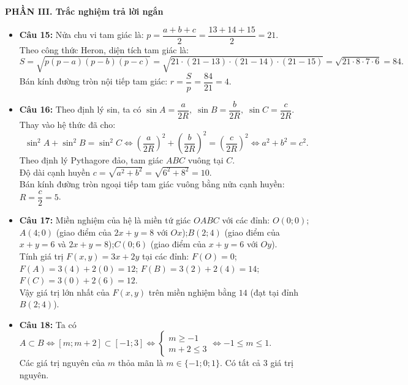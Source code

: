 \documentclass[12pt,a4paper]{article}
\begin{document}
\vspace{0.15cm}
\textbf{PHẦN III. Trắc nghiệm trả lời ngắn}
\begin{itemize}[leftmargin=0.6cm, itemsep=1.5pt, topsep=1pt]
    \item \textbf{Câu 15:} Nửa chu vi tam giác là: $p = \dfrac{a + b + c}{2} = \dfrac{13 + 14 + 15}{2} = 21$.\\
    Theo công thức Heron, diện tích tam giác là:
    \[
    S = \sqrt{p(p - a)(p - b)(p - c)} = \sqrt{21 \cdot (21 - 13) \cdot (21 - 14) \cdot (21 - 15)} = \sqrt{21 \cdot 8 \cdot 7 \cdot 6} = 84.
    \]
    Bán kính đường tròn nội tiếp tam giác: $r = \dfrac{S}{p} = \dfrac{84}{21} = 4$.
    \item \textbf{Câu 16:} Theo định lý sin, ta có $\sin A = \dfrac{a}{2R},\; \sin B = \dfrac{b}{2R},\; \sin C = \dfrac{c}{2R}$.\\
    Thay vào hệ thức đã cho:
    \[
    \sin^2 A + \sin^2 B = \sin^2 C \iff \left(\dfrac{a}{2R}\right)^2 + \left(\dfrac{b}{2R}\right)^2 = \left(\dfrac{c}{2R}\right)^2 \iff a^2 + b^2 = c^2.
    \]
    Theo định lý Pythagore đảo, tam giác $ABC$ vuông tại $C$.\\
    Độ dài cạnh huyền $c = \sqrt{a^2 + b^2} = \sqrt{6^2 + 8^2} = 10$.\\
    Bán kính đường tròn ngoại tiếp tam giác vuông bằng nửa cạnh huyền: $R = \dfrac{c}{2} = 5$.
    \item \textbf{Câu 17:} Miền nghiệm của hệ là miền tứ giác $OABC$ với các đỉnh:
    $O(0; 0)$;\quad $A(4; 0)$ (giao điểm của $2x + y = 8$ với $Ox$);\quad $B(2; 4)$ (giao điểm của $x + y = 6$ và $2x + y = 8$);\quad $C(0; 6)$ (giao điểm của $x + y = 6$ với $Oy$).\\
    Tính giá trị $F(x, y) = 3x + 2y$ tại các đỉnh:
    $F(O) = 0$; $F(A) = 3(4) + 2(0) = 12$; $F(B) = 3(2) + 2(4) = 14$; $F(C) = 3(0) + 2(6) = 12$.\\
    Vậy giá trị lớn nhất của $F(x, y)$ trên miền nghiệm bằng $14$ (đạt tại đỉnh $B(2; 4)$).
    \item \textbf{Câu 18:} Ta có $A \subset B \iff [m; m + 2] \subset [-1; 3] \iff \begin{cases} m \ge -1 \\ m + 2 \le 3 \end{cases} \iff -1 \le m \le 1$.\\
    Các giá trị nguyên của $m$ thỏa mãn là $m \in \{-1; 0; 1\}$. Có tất cả $3$ giá trị nguyên.
\end{itemize}
\end{document}
